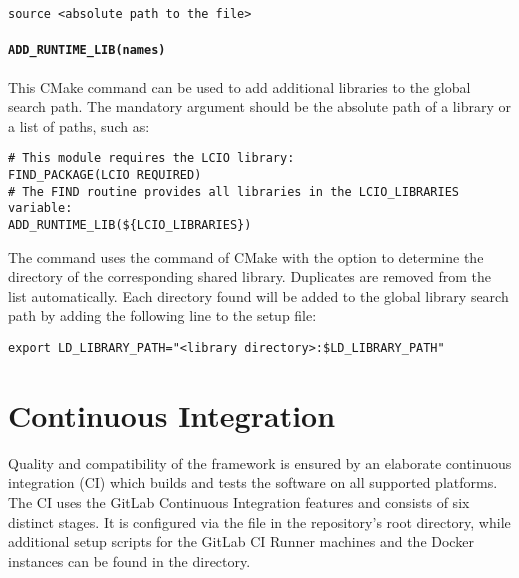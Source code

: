 \begin{verbatim}
source <absolute path to the file>
\end{verbatim}

\paragraph{\texttt{\textbf{ADD\_RUNTIME\_LIB(names)}}}

This CMake command can be used to add additional libraries to the global search path.
The mandatory argument  should be the absolute path of a library or a list of paths, such as:

\begin{verbatim}
# This module requires the LCIO library:
FIND_PACKAGE(LCIO REQUIRED)
# The FIND routine provides all libraries in the LCIO_LIBRARIES variable:
ADD_RUNTIME_LIB(${LCIO_LIBRARIES})
\end{verbatim}

The command uses the  command of CMake with the  option to determine the directory of the corresponding shared library.
Duplicates are removed from the list automatically.
Each directory found will be added to the global library search path by adding the following line to the setup file:

\begin{verbatim}
export LD_LIBRARY_PATH="<library directory>:$LD_LIBRARY_PATH"
\end{verbatim}

\section{Continuous Integration}
\label{sec:ci}

Quality and compatibility of the \corry framework is ensured by an elaborate continuous integration (CI) which builds and tests the software on all supported platforms.
The \corry CI uses the GitLab Continuous Integration features and consists of six distinct stages.
It is configured via the  file in the repository's root directory, while additional setup scripts for the GitLab CI Runner machines and the Docker instances can be found in the  directory.


